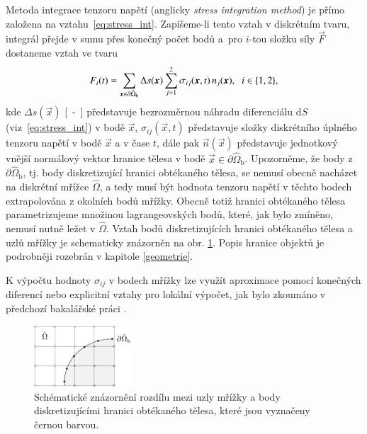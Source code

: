 Metoda integrace tenzoru napětí (anglicky \textit{stress integration method}) je přímo založena na vztahu~\eqref{eq:stress_int}. Zapíšeme-li tento vztah v diskrétním tvaru, integrál přejde v sumu přes konečný počet bodů a~pro $ i $-tou složku síly $ \vec{F} $ dostaneme vztah ve tvaru
\begin{equation}\label{eq:sim}
{F}_{i}(t) = \sum_{\vec{x} \in  \partial \hat{\Omega}_{\mathrm{b}}}^{} \Delta s(\vec{x}) \sum_{j=1}^{2}  \sigma_{ij} (\vec{x}, t) \, n_{j} (\vec{x})  , \hspace{2mm} i \in \{ 1, 2 \},
\end{equation}
kde $ \Delta s(\vec{x}) $ \si{[-]} představuje bezrozměrnou náhradu diferenciálu $ \mathrm{d}S $ (viz~\eqref{eq:stress_int}) v bodě $ \vec{x}$, $ \sigma_{ij} (\vec{x}, t)$ představuje složky diskrétního úplného tenzoru napětí v bodě $ \vec{x} $ a v čase $ t $, dále pak $ \vec{n}(\vec{x}) $ představuje jednotkový vnější normálový vektor hranice tělesa v bodě $ \vec{x} \in \partial \hat{\Omega}_{\mathrm{b}}$. Upozorněme, že body z $ \partial \hat{\Omega}_{\mathrm{b}} $, tj. body diskretizující hranici obtékaného tělesa, se nemusí obecně nacházet na diskrétní mřížce $ \hat{\Omega} $, a tedy musí být hodnota tenzoru napětí v těchto bodech extrapolována z okolních bodů mřížky. Obecně totiž hranici obtékaného tělesa parametrizujeme množinou lagrangeovských bodů, které, jak bylo zmíněno, nemusí nutně ležet v $ \hat{\Omega} $. Vztah bodů diskretizujících hranici obtékaného tělesa a uzlů mřížky je schematicky znázorněn na obr. \ref{fig:body hranice sim}. Popis hranice objektů je podrobněji rozebrán v kapitole \ref{geometrie}.

K výpočtu hodnoty $ \sigma_{ij} $ v bodech mřížky lze využít aproximace pomocí konečných diferencí nebo explicitní vztahy pro lokální výpočet, jak bylo zkoumáno v předchozí bakalářské práci \cite{JB}.

\begin{figure}[H]
	\centering
	\includegraphics[width=0.32\textwidth]{Images/stressintegration.pdf}
	\caption{Schématické znázornění rozdílu mezi uzly mřížky a body diskretizujícími hranici obtékaného tělesa, které jsou vyznačeny černou barvou.}
	\label{fig:body hranice sim}
\end{figure}


